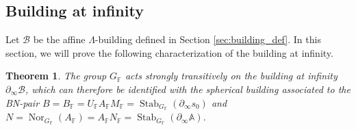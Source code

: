 \documentclass[12pt]{amsart}
\newcommand{\F}{\mathbb{F} }
\newcommand{\A}{\mathbb{A}}
\newcommand{\B}{\mathcal{B}}
\numberwithin{equation}{section}
\newtheorem{theorem}{Theorem}[section]
\theoremstyle{remark} %
\begin{document}
\subsection{Building at infinity}

Let $\B$ be the affine $\Lambda$-building defined in Section \ref{sec:building_def}.
In this section, we will prove the following characterization of the building at infinity.

\begin{theorem}\label{thm:building_at_infty}
	The group $G_\F$ acts strongly transitively on the building at infinity $\partial_\infty\B$, which can therefore be identified with the spherical building associated to the BN-pair $B=B_\F = U_\F A_\F M_\F =  \operatorname{Stab}_{G_\F}(\partial_\infty s_0)$ and $N=\operatorname{Nor}_{G_\F}(A_\F) = A_\F N_\F = \operatorname{Stab}_{G_\F}(\partial_\infty \mathbb{A})$.
\end{theorem}
\end{document}
